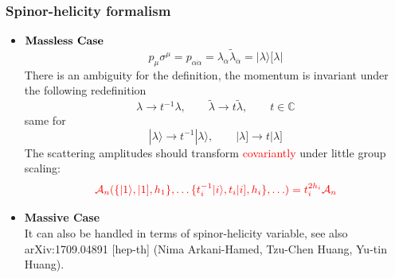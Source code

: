 \documentclass{beamer}
\newcommand{\aket}[1]{|#1\rangle}
\newcommand{\sket}[1]{|#1]}
\begin{document}
\begin{frame}
\frametitle{Spinor-helicity formalism}
    \begin{itemize}
        \item $\textbf{\text{Massless Case}}$\\
    \begin{equation*}
        p_\mu \sigma^\mu=p_{\alpha\dot{\alpha}}=\lambda_\alpha \tilde{\lambda}_{\dot{\alpha}}=\aket{\lambda}[\lambda|
    \end{equation*}
    There is an ambiguity for the definition, the momentum is invariant under the following redefinition
    \begin{equation*}
        \lambda \rightarrow t^{-1}\lambda, \qquad \tilde{\lambda}\rightarrow t\tilde{\lambda}, \qquad t\in\mathbb{C} 
    \end{equation*}
    same for
    \begin{equation*}
        \aket{\lambda}\rightarrow t^{-1}\aket{\lambda}, \qquad \sket{\lambda}\rightarrow t\sket{\lambda}
    \end{equation*}
    The scattering amplitudes should transform \textcolor{red}{covariantly} under little group scaling:
    \begin{equation*}
        \color{red} \mathcal{A}_n(\{\aket{1},\sket{1},h_1\},\ldots\{t_i^{-1}\aket{i},t_i\sket{i},h_i\},\ldots )=t_i^{2h_i}\mathcal{A}_n
    \end{equation*}
    \end{itemize}
\vspace{-2em}
    \begin{itemize}
    \item \textbf{Massive Case}\\
    It can also be handled in terms of spinor-helicity variable, see also 	arXiv:1709.04891 [hep-th] (Nima Arkani-Hamed, Tzu-Chen Huang, Yu-tin Huang).
    \end{itemize}
\end{frame}
\end{document}
